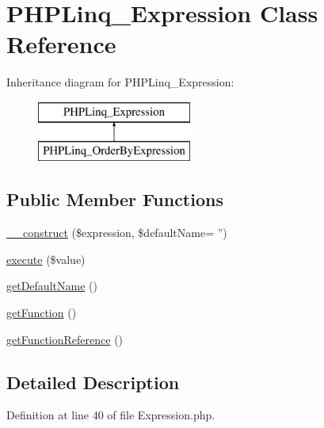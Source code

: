\hypertarget{class_p_h_p_linq___expression}{\section{\-P\-H\-P\-Linq\-\_\-\-Expression \-Class \-Reference}
\label{class_p_h_p_linq___expression}
}
\-Inheritance diagram for \-P\-H\-P\-Linq\-\_\-\-Expression\-:\begin{figure}[H]
\begin{center}
\leavevmode
\includegraphics[height=2.000000cm]{class_p_h_p_linq___expression}
\end{center}
\end{figure}
\subsection*{\-Public \-Member \-Functions}
\begin{DoxyCompactItemize}
\item 
\hyperlink{class_p_h_p_linq___expression_a5b37b99aac011dd24341472e02813496}{\-\_\-\-\_\-construct} (\$expression, \$default\-Name= '')
\item 
\hyperlink{class_p_h_p_linq___expression_aee159037bf6217e4b2f0ab57235dada8}{execute} (\$value)
\item 
\hyperlink{class_p_h_p_linq___expression_a6b13a94850006d0497889e389eea9885}{get\-Default\-Name} ()
\item 
\hyperlink{class_p_h_p_linq___expression_a3cb728ca27acfebd282caecdb8a1f5fc}{get\-Function} ()
\item 
\hyperlink{class_p_h_p_linq___expression_a13bec1b4324ac0cbd5d40826369f5135}{get\-Function\-Reference} ()
\end{DoxyCompactItemize}


\subsection{\-Detailed \-Description}


\-Definition at line 40 of file \-Expression.\-php.



